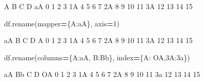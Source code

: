 \documentclass[
]{book}
\newenvironment{Shaded}{\begin{snugshade}}{\end{snugshade}}
\newcommand{\DecValTok}[1]{\textcolor[rgb]{0.00,0.00,0.81}{#1}}
\newcommand{\NormalTok}[1]{#1}
\newcommand{\OperatorTok}[1]{\textcolor[rgb]{0.81,0.36,0.00}{\textbf{#1}}}
\newcommand{\StringTok}[1]{\textcolor[rgb]{0.31,0.60,0.02}{#1}}
\begin{document}
\begin{Shaded}
\begin{Highlighting}[]
\NormalTok{     A   B   C   D}
\NormalTok{aA   0   1   2   3}
\NormalTok{1A   4   5   6   7}
\NormalTok{2A   8   9  10  11}
\NormalTok{3A  12  13  14  15}
\end{Highlighting}
\end{Shaded}

\begin{Shaded}
\begin{Highlighting}[]
\NormalTok{df.rename(mapper}\OperatorTok{=}\NormalTok{\{}\StringTok{\textquotesingle{}A\textquotesingle{}}\NormalTok{:}\StringTok{\textquotesingle{}aA\textquotesingle{}}\NormalTok{\}, axis}\OperatorTok{=}\DecValTok{1}\NormalTok{)}
\end{Highlighting}
\end{Shaded}

\begin{Shaded}
\begin{Highlighting}[]
\NormalTok{    aA   B   C   D}
\NormalTok{A    0   1   2   3}
\NormalTok{1A   4   5   6   7}
\NormalTok{2A   8   9  10  11}
\NormalTok{3A  12  13  14  15}
\end{Highlighting}
\end{Shaded}

\begin{Shaded}
\begin{Highlighting}[]
\NormalTok{df.rename(columns}\OperatorTok{=}\NormalTok{\{}\StringTok{\textquotesingle{}A\textquotesingle{}}\NormalTok{:}\StringTok{\textquotesingle{}aA\textquotesingle{}}\NormalTok{, }\StringTok{\textquotesingle{}B\textquotesingle{}}\NormalTok{:}\StringTok{\textquotesingle{}Bb\textquotesingle{}}\NormalTok{\}, index}\OperatorTok{=}\NormalTok{\{}\StringTok{\textquotesingle{}A\textquotesingle{}}\NormalTok{: }\StringTok{\textquotesingle{}OA\textquotesingle{}}\NormalTok{,}\StringTok{\textquotesingle{}3A\textquotesingle{}}\NormalTok{:}\StringTok{\textquotesingle{}3a\textquotesingle{}}\NormalTok{\})}
\end{Highlighting}
\end{Shaded}

\begin{Shaded}
\begin{Highlighting}[]
\NormalTok{    aA  Bb   C   D}
\NormalTok{OA   0   1   2   3}
\NormalTok{1A   4   5   6   7}
\NormalTok{2A   8   9  10  11}
\NormalTok{3a  12  13  14  15}
\end{Highlighting}
\end{Shaded}
\end{document}
